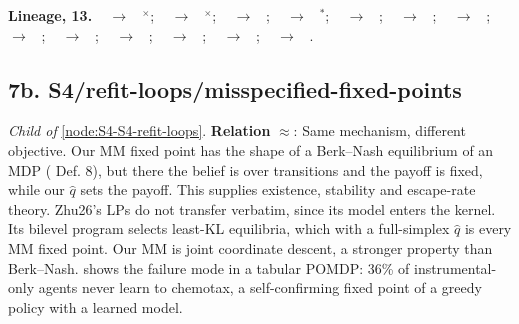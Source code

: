 \documentclass[10pt]{article}
\newcommand{\memb}[1]{\par\smallskip\textbf{#1}\quad}
\begin{document}
\memb{Lineage, 13.} {\footnotesize \citeauthor{Harvey-homeostasis04}~\citeyear{Harvey-homeostasis04} $\to$ \citeauthor{Dean-emergent22}~\citeyear{Dean-emergent22}$^\times$; \citeauthor{McDonaldGibson-environmental08}~\citeyear{McDonaldGibson-environmental08} $\to$ \citeauthor{Dean-emergent22}~\citeyear{Dean-emergent22}$^\times$; \citeauthor{Perdomo-performative20}~\citeyear{Perdomo-performative20} $\to$ \citeauthor{Dean-emergent22}~\citeyear{Dean-emergent22}; \citeauthor{Perdomo-performative20}~\citeyear{Perdomo-performative20} $\to$ \citeauthor{Mandal-performative23}~\citeyear{Mandal-performative23}$^\ast$; \citeauthor{Perdomo-performative20}~\citeyear{Perdomo-performative20} $\to$ \citeauthor{Piliouras-multiagent23}~\citeyear{Piliouras-multiagent23}; \citeauthor{Perdomo-performative20}~\citeyear{Perdomo-performative20} $\to$ \citeauthor{Gauthier-explaining26}~\citeyear{Gauthier-explaining26}; \citeauthor{Perdomo-performative20}~\citeyear{Perdomo-performative20} $\to$ \citeauthor{Prytula-global26}~\citeyear{Prytula-global26}; \citeauthor{Mandal-performative23}~\citeyear{Mandal-performative23} $\to$ \citeauthor{Rodemann-reciprocal24}~\citeyear{Rodemann-reciprocal24}; \citeauthor{Mandal-performative23}~\citeyear{Mandal-performative23} $\to$ \citeauthor{Wolf-reward25}~\citeyear{Wolf-reward25}; \citeauthor{Shumailov-curse23}~\citeyear{Shumailov-curse23} $\to$ \citeauthor{Hardt-retraining26}~\citeyear{Hardt-retraining26}; \citeauthor{Alemohammad-selfconsuming23}~\citeyear{Alemohammad-selfconsuming23} $\to$ \citeauthor{Hardt-retraining26}~\citeyear{Hardt-retraining26}; \citeauthor{Bertrand-stability23}~\citeyear{Bertrand-stability23} $\to$ \citeauthor{Hardt-retraining26}~\citeyear{Hardt-retraining26}; \citeauthor{Gerstgrasser-model24}~\citeyear{Gerstgrasser-model24} $\to$ \citeauthor{Hardt-retraining26}~\citeyear{Hardt-retraining26}.}

\subsection{7b. S4/refit-loops/misspecified-fixed-points}\label{node:S4-S4-refit-loops-misspecified-fixed-points}
\textit{Child of} \ref{node:S4-S4-refit-loops}. \textbf{Relation} $\approx$: Same mechanism, different objective. Our MM fixed point has the shape of a Berk--Nash equilibrium of an MDP (\citet{Esponda-equilibrium21} Def. 8), but there the belief is over transitions and the payoff is fixed, while our \ensuremath{\hat{q}} sets the payoff. This supplies existence, stability and escape-rate theory. Zhu26's LPs do not transfer verbatim, since its model enters the kernel. Its bilevel program selects least-KL equilibria, which with a full-simplex \ensuremath{\hat{q}} is every MM fixed point. Our MM is joint coordinate descent, a stronger property than Berk--Nash. \citet{Tschantz-learning20} shows the failure mode in a tabular POMDP: 36\% of instrumental-only agents never learn to chemotax, a self-confirming fixed point of a greedy policy with a learned model.
\end{document}
